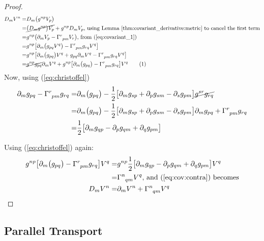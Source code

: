 \documentclass[]{article}
\newcommand\numberthis{\addtocounter{equation}{1}\tag{\theequation}}
\begin{document}
{\begin{proof}
	\begin{align*}
		D_m V^n =& D_m\big( g^{np} V_p\big)\\
		=&  \cancel{\big(D_m g^{np}\big) V_p} +  g^{np} D_m V_p \text{,  using Lemma \ref{thm:covariant_derivative:metric} to cancel the first term} \\
		=& g^{np} \big(\partial_m V_p -  \Gamma\indices{^r_{pm}} V_r\big) \text{, from (\ref{eq:covariant_1})}\\
		=& g^{np} \big[\partial_m \big(g_{pq} V^q\big) -  \Gamma\indices{^r_{pm}} g_{rq} V^q\big]\\
		=& g^{np} \big[ \partial_m \big(g_{pq} \big)V^q + g_{pq} \partial_m V^q -  \Gamma\indices{^r_{pm}} g_{rq} V^q\big]\\
		=& \cancel{g^{np} g_{pq}} \partial_m V^q +  g^{np} \big[ \partial_m \big(g_{pq} \big) -   \Gamma\indices{^r_{pm}} g_{rq} \big] V^q \numberthis\label{eq:cov:contra}
	\end{align*}
	Now, using (\ref{eq:christoffel})
	\begin{align*}
		 \partial_m g_{pq} -   \Gamma\indices{^r_{pm}} g_{rq} =&\partial_m \big(g_{pq} \big) - \frac{1}{2}\big[\partial_m g_{sp} + \partial_p g_{sm}- \partial_s g_{pm}\big]  \cancel{g^{sr} g_{rq}}\\
		=& \partial_m \big(g_{pq} \big) - \frac{1}{2}\big[\partial_m g_{sp} + \partial_p g_{sm}- \partial_s g_{pm}\big] \partial_m g_{pq} +   \Gamma\indices{^r_{pm}} g_{rq}\\
		 =& \frac{1}{2}\big[\partial_m g_{qp} - \partial_p g_{qm}+ \partial_q g_{pm}\big] 
	\end{align*}
	
	Using (\ref{eq:christoffel}) again:
	\begin{align*}
		g^{np} \big[ \partial_m \big(g_{pq} \big) -   \Gamma\indices{^r_{pm}} g_{rq} \big] V^q =& g^{np} \frac{1}{2}\big[\partial_m g_{qp} - \partial_p g_{qm}+ \partial_q g_{pm}\big] V^q\\
		=& \Gamma \indices{^n_{qm}} V^q \text{, and (\ref{eq:cov:contra}) becomes}\\
		D_m V^n =& \partial_m V^n +  \Gamma \indices{^n_{qm}} V^q
	\end{align*}
	
\end{proof}

\subsection{Parallel Transport}

}
\end{document}
